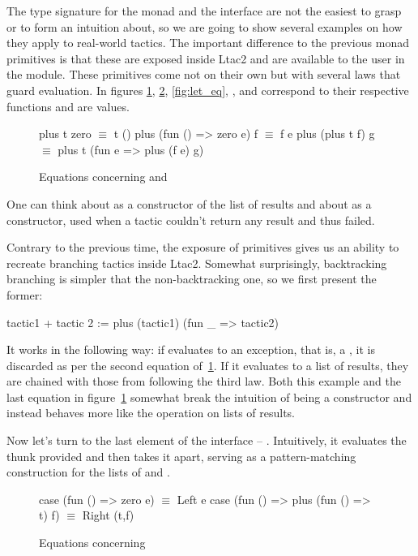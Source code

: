 The type signature for the monad and the interface are not the easiest to grasp or to form an intuition about, so we are going to show several examples on how they apply to real-world tactics.
The important difference to the previous monad primitives is that these are exposed inside Ltac2 and are available to the user in the  module.
These primitives come not on their own but with several laws that guard evaluation.
In figures \ref{fig:zero_plus_eq}, \ref{fig:case_eq}, \ref{fig:let_eq}, ,  and  correspond to their respective functions and  are values.
\begin{figure}[H]
\begin{coq}
plus t zero $\equiv$ t ()
plus (fun () => zero e) f $\equiv$ f e
plus (plus t f) g $\equiv$ plus t (fun e => plus (f e) g)
\end{coq}
\caption{Equations concerning  and }
\label{fig:zero_plus_eq}
\end{figure}

One can think about  as a  constructor of the list of results and about  as a  constructor, used when a tactic couldn't return any result and thus failed.

Contrary to the previous time, the exposure of primitives gives us an ability to recreate branching tactics inside Ltac2.
Somewhat surprisingly, backtracking branching is simpler that the non-backtracking one, so we first present the former:
\begin{coq}
tactic1 + tactic 2 := plus (tactic1) (fun _ => tactic2)
\end{coq}
It works in the following way: if  evaluates to an exception, that is, a , it is discarded as per the second equation of~\ref{fig:zero_plus_eq}.
If it evaluates to a list of results, they are chained with those from  following the third law.
Both this example and the last equation in figure~\ref{fig:zero_plus_eq} somewhat break the intuition of  being a  constructor and instead behaves more like the  operation on lists of results.

Now let's turn to the last element of the interface -- .
Intuitively, it evaluates the thunk provided and then takes it apart, serving as a pattern-matching construction for the lists of  and .
\begin{figure}[H]
\begin{coq}
case (fun () => zero e) $\equiv$ Left e
case (fun () => plus (fun () => t) f) $\equiv$ Right (t,f)
\end{coq}
\caption{Equations concerning }
\label{fig:case_eq}
\end{figure}

